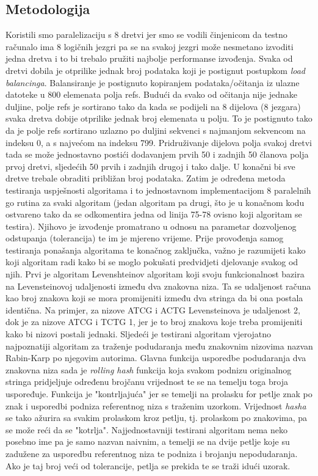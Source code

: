 \documentclass[conference]{IEEEtran}
\begin{document}
\subsection{Metodologija}
Koristili smo paralelizaciju s 8 dretvi jer smo se vodili činjenicom da testno računalo ima 8 logičnih jezgri pa se na svakoj jezgri može nesmetano izvoditi jedna dretva i to bi trebalo pružiti najbolje performanse izvođenja. Svaka od dretvi dobila je otprilike jednak broj podataka koji je postignut postupkom \textit{load balancinga}. Balansiranje je postignuto kopiranjem podataka/očitanja iz ulazne datoteke u 800 elemenata polja refs. Budući da svako od očitanja nije jednake duljine, polje refs je sortirano tako da kada se podijeli na 8 dijelova (8 jezgara) svaka dretva dobije otprilike jednak broj elemenata u polju. To je postignuto tako da je polje refs sortirano uzlazno po duljini sekvenci s najmanjom sekvencom na indeksu 0, a s najvećom na indeksu 799. Pridruživanje dijelova polja svakoj dretvi tada se može jednostavno postići dodavanjem prvih 50 i zadnjih 50 članova polja prvoj dretvi, sljedećih 50 prvih i zadnjih drugoj i tako dalje. U konačni bi sve dretve trebale obraditi približan broj podataka. Zatim je određena metoda testiranja uspješnosti algoritama i to jednostavnom implementacijom 8 paralelnih go rutina za svaki algoritam (jedan algoritam pa drugi, što je u konačnom kodu ostvareno tako da se odkomentira jedna od linija 75-78 ovisno koji algoritam se testira). Njihovo je izvođenje promatrano u odnosu na parametar dozvoljenog odstupanja (tolerancija) te im je mjereno vrijeme.
Prije provođenja samog testiranja ponašanja algoritama te konačnog zaključka, važno je razumijeti kako koji algoritam radi kako bi se moglo pokušati predvidjeti djelovanje svakog od njih. Prvi je algoritam Levenshteinov algoritam koji svoju funkcionalnost bazira na Levensteinovoj udaljenosti između dva znakovna niza. Ta se udaljenost računa kao broj znakova koji se mora promijeniti između dva stringa da bi ona postala identična. Na primjer, za nizove ATCG i ACTG Levensteinova je udaljenost 2, dok je za nizove ATCG i TCTG 1, jer je to broj znakova koje treba promijeniti kako bi nizovi postali jednaki. Sljedeći je testirani algoritam vjerojatno najpoznatiji algoritam za traženje podudaranja među znakovnim nizovima nazvan Rabin-Karp po njegovim autorima. Glavna funkcija usporedbe podudaranja dva znakovna niza sada je \textit{rolling hash} funkcija koja svakom podnizu originalnog stringa pridjeljuje određenu brojčanu vrijednost te se na temelju toga broja uspoređuje. Funkcija je "kontrljajuća" jer se temelji na prolasku for petlje znak po znak i usporedbi podniza referentnog niza s traženim uzorkom. Vrijednost \textit{hasha} se tako ažurira sa svakim prolaskom kroz petlju, tj. prolaskom po znakovima, pa se može reći da se "kotrlja". Najjednostavniji testirani algoritam nema neko posebno ime pa je samo nazvan naivnim, a temelji se na dvije petlje koje su zadužene za usporedbu referentnog niza te podniza i brojanju nepodudaranja. Ako je taj broj veći od tolerancije, petlja se prekida te se traži idući uzorak.
\end{document}
